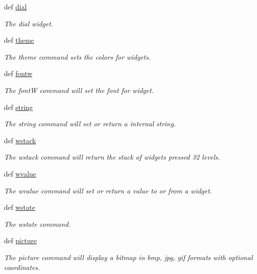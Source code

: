 \begin{DoxyCompactItemize}
def \hyperlink{group___widgets_ga0122f7d8c41bb07221be8a778ca8fd53}{dial}
\begin{DoxyCompactList}\small\item\em The dial widget. \end{DoxyCompactList}\item 
def \hyperlink{group___widgets_ga334488d30595cf0dd9e2742c65558e2c}{theme}
\begin{DoxyCompactList}\small\item\em The theme command sets the colors for widgets. \end{DoxyCompactList}\item 
def \hyperlink{group___widgets_ga0efc2d431900e2b77a30e19bb556fb3a}{fontw}
\begin{DoxyCompactList}\small\item\em The font\-W command will set the font for widget. \end{DoxyCompactList}\item 
def \hyperlink{group___widgets_gae2b2686b92f93d6fc84de7a19518a89f}{string}
\begin{DoxyCompactList}\small\item\em The string command will set or return a internal string. \end{DoxyCompactList}\item 
def \hyperlink{group___widgets_ga223301539fa77d634fc44b480a08f6a7}{wstack}
\begin{DoxyCompactList}\small\item\em The wstack command will return the stack of widgets pressed 32 levels. \end{DoxyCompactList}\item 
def \hyperlink{group___widgets_ga57c35a2e95d92bbeaeefc71ffd9998fc}{wvalue}
\begin{DoxyCompactList}\small\item\em The wvalue command will set or return a value to or from a widget. \end{DoxyCompactList}\item 
def \hyperlink{group___widgets_ga68f19c87c7284b550f150b81327125aa}{wstate}
\begin{DoxyCompactList}\small\item\em The wstate command. \end{DoxyCompactList}\item 
def \hyperlink{group___bitmap_font_ga675ef467cb7a69ab8c19024bfd0775d6}{picture}
\begin{DoxyCompactList}\small\item\em The picture command will display a bitmap in bmp, jpg, gif formats with optional coordinates. \end{DoxyCompactList}\item 

\end{DoxyCompactItemize}
